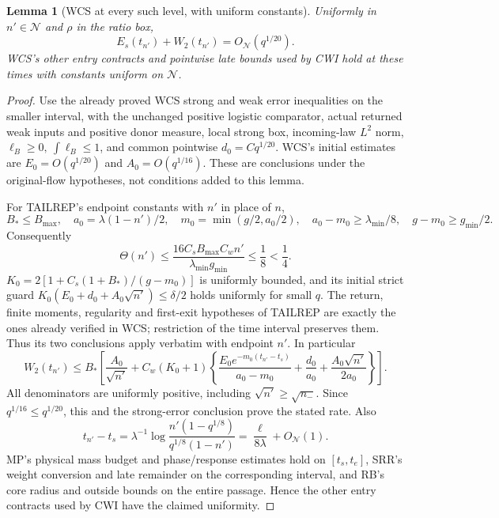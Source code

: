 \documentclass[11pt]{article}
\numberwithin{equation}{section}
\newtheorem{lemma}[theorem]{Lemma}
\theoremstyle{remark}\newtheorem{remark}[theorem]{Remark}
\begin{document}
\begin{lemma}[WCS at every such level, with uniform constants]
\label{an07psev1:levels}
Uniformly in \(n'\in\mathcal N\) and \(\rho\) in the ratio box,
\[
 E_s(t_{n'})+W_2(t_{n'})=O_{\mathcal N}(q^{1/20}).
 \label{an07psev1:levelselection}
 \]
WCS's other entry contracts and pointwise late bounds used
by CWI hold at these times with constants uniform on
\(\mathcal N\).
\end{lemma}
\begin{proof}
Use the already proved WCS strong and weak error inequalities
on the smaller interval, with the unchanged positive logistic
comparator, actual returned weak inputs and positive donor
measure, local strong box, incoming-law \(L^2\) norm,
\(\ell_B\ge0,\ \int\ell_B\le1\), and common pointwise
\(d_0=Cq^{1/20}\). WCS's initial estimates are
\(E_0=O(q^{1/20})\) and \(A_0=O(q^{1/16})\).
These are conclusions under the original-flow hypotheses,
not conditions added to this lemma.

For TAILREP's endpoint constants with \(n'\) in place of \(n\),
\[
 B_*\le B_{\max},\quad a_0=\lambda(1-n')/2,\quad
 m_0=\min(g/2,a_0/2),\quad
 a_0-m_0\ge\lambda_{\min}/8,\quad g-m_0\ge g_{\min}/2 .
 \]
Consequently
\[
 \Theta(n')\le
 \frac{16C_sB_{\max}C_wn'}{\lambda_{\min}g_{\min}}
 \le\frac18<\frac14 .
 \]
\(K_0=2[1+C_s(1+B_*)/(g-m_0)]\) is uniformly bounded,
and its initial strict guard
\(K_0(E_0+d_0+A_0\sqrt{n'})\le\delta/2\) holds uniformly
for small \(q\). The return, finite moments, regularity and
first-exit hypotheses of TAILREP are exactly the ones already
verified in WCS; restriction of the time interval preserves them.
Thus its two conclusions apply verbatim with endpoint \(n'\).
In particular
\[
 W_2(t_{n'})\le B_*\left[
 \frac{A_0}{\sqrt{n'}}+
 C_w(K_0+1)\left\{
 \frac{E_0e^{-m_0(t_{n'}-t_s)}}{a_0-m_0}
 +\frac{d_0}{a_0}+\frac{A_0\sqrt{n'}}{2a_0}\right\}\right].
 \]
All denominators are uniformly positive, including
\(\sqrt{n'}\ge\sqrt{n_-}\). Since \(q^{1/16}\le q^{1/20}\),
this and the strong-error conclusion prove the stated rate.
Also
\[
 t_{n'}-t_s=\lambda^{-1}
    \log\frac{n'(1-q^{1/8})}{q^{1/8}(1-n')}
           =\frac{\ell}{8\lambda}+O_{\mathcal N}(1).
 \]
MP's physical mass budget and phase/response estimates hold
on \([t_s,t_e]\), SRR's weight conversion and late remainder
on the corresponding interval, and RB's core radius and
outside bounds on the entire passage. Hence the other
entry contracts used by CWI have the claimed uniformity.
\end{proof}
\end{document}
